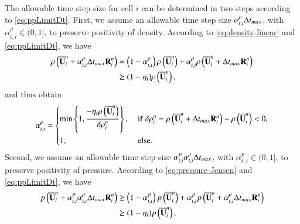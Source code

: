 The allowable time step size for cell $i$ can be determined in two steps according to \eqref{eq:ppLimitDt}.
First, we assume an allowable time step size
$\alpha_{t,i}^{\rho} \mathrm\Delta t_{max}$, with $\alpha_{t,i}^{\rho} \in (0,1]$, to preserve positivity of density. According to \eqref{eq:density-linear} and \eqref{eq:ppLimitDt}, we have
\begin{equation}
\label{eq:alpha-t-rho-ineq}
    \begin{split}
        \rho\left(\overline{\mathbf{U}}^n_i + \alpha_{t,i}^{\rho} \mathrm\Delta t_{max} \mathbf{R}^n_i\right) &= \left(1- \alpha_{t,i}^{\rho}\right)\rho\left(\overline{\mathbf{U}}^n_i\right) + \alpha_{t,i}^{\rho} \rho\left(\overline{\mathbf{U}}^n_i + \mathrm\Delta t_{max} \mathbf{R}^n_i\right) \\
    &\geq
    (1- \eta_t)
    \rho\left(\overline{\mathbf{U}}_i^n\right),
    \end{split}
\end{equation}
and thus obtain
\begin{equation}
\label{eq:alpha-t-rho}
    \alpha_{t,i}^{\rho} = \begin{dcases}
    \min\left\{1, \dfrac{-\eta_t \rho\left(\UM^n_i\right)}{\delta \rho^n_i} \right\}, & \
        \mathrm{if} \ 
        \delta \rho^n_i= \rho\left(\UM^n_i + \inc t_{max} \R^n_i\right) - \rho\left(\UM^n_i\right) < 0,
        \\
        1,  & \ \mathrm{else}.
    \end{dcases}
\end{equation}
Second, we assume an allowable time step size
$\alpha_{t,i}^{p}  \alpha_{t,i}^{\rho} \mathrm\Delta t_{max}$, with $\alpha_{t,i}^{p} \in (0,1]$,
to preserve positivity of pressure. According to \eqref{eq:pressure-Jensen} and \eqref{eq:ppLimitDt}, we have
\begin{equation}
\begin{split}
    p\left(\overline{\mathbf{U}}^n_i +  \alpha_{t,i}^{p} \alpha_{t,i}^{\rho} \mathrm\Delta t_{max} \mathbf{R}^n_i\right) &\geq \left(1-\alpha_{t,i}^{p}\right)p\left(\overline{\mathbf{U}}^n_i\right) + \alpha_{t,i}^{p} p\left(\overline{\mathbf{U}}^n_i + \alpha_{t,i}^{\rho} \mathrm\Delta t_{max} \mathbf{R}^n_i\right) \\
    &\geq
    (1- \eta_t)
    p\left(\overline{\mathbf{U}}_i^n\right),
\end{split}
\end{equation}
